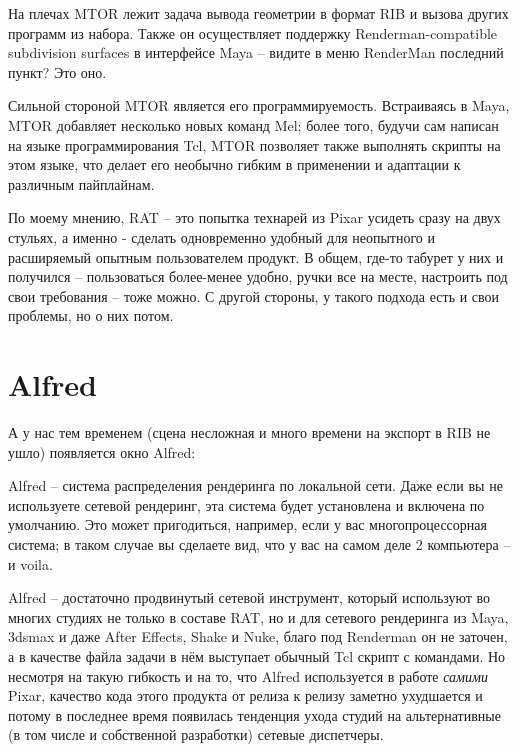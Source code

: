  На плечах MTOR лежит задача вывода геометрии в
    формат RIB и вызова других программ из набора. Также он
    осуществляет поддержку Renderman-compatible subdivision surfaces в
    интерфейсе Maya – видите в меню RenderMan последний пункт? Это
    оно.

 Сильной стороной MTOR является его
    программируемость. Встраиваясь в Maya, MTOR добавляет несколько
    новых команд Mel; более того, будучи сам написан на языке
    программирования Tcl, MTOR позволяет также выполнять скрипты на
    этом языке, что делает его необычно гибким в применении и адаптации
    к различным пайплайнам.

 По моему мнению, RAT – это попытка технарей из
    Pixar усидеть сразу на двух стульях, а именно - сделать
    одновременно удобный для неопытного и расширяемый опытным
    пользователем продукт. В общем, где-то табурет у них и получился –
    пользоваться более-менее удобно, ручки все на месте, настроить под
    свои требования – тоже можно. С другой стороны, у такого подхода
    есть и свои проблемы, но о них потом.
  
\section*{Alfred}

 А у нас тем временем (сцена несложная и много
    времени на экспорт в RIB не ушло) появляется окно
    Alfred:


 Alfred – система распределения рендеринга по
    локальной сети. Даже если вы не используете сетевой рендеринг, эта
    система будет установлена и включена по умолчанию. Это может
    пригодиться, например, если у вас многопроцессорная система; в
    таком случае вы сделаете вид, что у вас на самом деле 2 компьютера
    – и voila.

 Alfred – достаточно продвинутый сетевой инструмент,
    который используют во многих студиях не только в составе RAT, но и
    для сетевого рендеринга из Maya, 3dsmax и даже After Effects, Shake
    и Nuke, благо под Renderman он не заточен, а в качестве файла
    задачи в нём выступает обычный Tcl скрипт с командами. Но несмотря
    на такую гибкость и на то, что Alfred используется в работе {\it самими} Pixar, качество
    кода этого продукта от релиза к релизу заметно ухудшается и потому
    в последнее время появилась тенденция ухода студий на
    альтернативные (в том числе и собственной разработки) сетевые
    диспетчеры.

